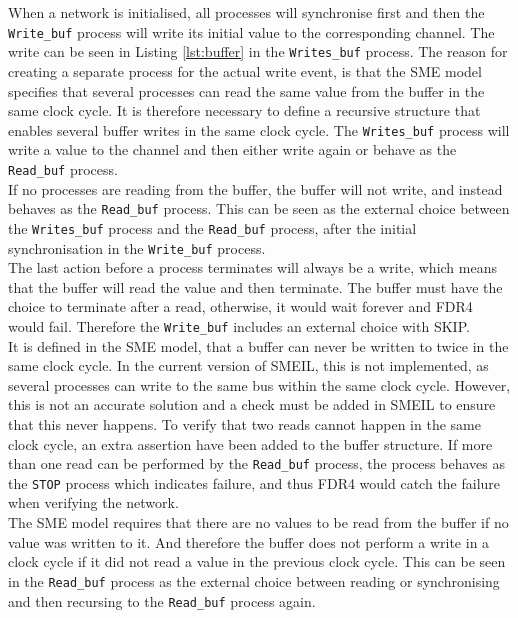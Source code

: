 When a network is initialised, all processes will synchronise first and then the \texttt{Write\_buf} process will write its initial value to the corresponding channel. The write can be seen in Listing \ref{lst:buffer} in the \texttt{Writes\_buf} process. The reason for creating a separate process for the actual write event, is that the SME model specifies that several processes can read the same value from the buffer in the same clock cycle. It is therefore necessary to define a recursive structure that enables several buffer writes in the same clock cycle. The \texttt{Writes\_buf} process will write a value to the channel and then either write again or behave as the \texttt{Read\_buf} process.\\

If no processes are reading from the buffer, the buffer will not write, and instead behaves as the \texttt{Read\_buf} process. This can be seen as the external choice between the \texttt{Writes\_buf} process and the \texttt{Read\_buf} process, after the initial synchronisation in the \texttt{Write\_buf} process.\\

The last action before a process terminates will always be a write, which means that the buffer will read the value and then terminate. The buffer must have the choice to terminate after a read, otherwise, it would wait forever and FDR4 would fail. Therefore the \texttt{Write\_buf} includes an external choice with SKIP. \\

It is defined in the SME model, that a buffer can never be written to twice in the same clock cycle. In the current version of SMEIL, this is not implemented, as several processes can write to the same bus within the same clock cycle. However, this is not an accurate solution and a check must be added in SMEIL to ensure that this never happens. To verify that two reads cannot happen in the same clock cycle, an extra assertion have been added to the buffer structure.
If more than one read can be performed by the \texttt{Read\_buf} process, the process behaves as the \texttt{STOP} process which indicates failure, and thus FDR4 would catch the failure when verifying the network.\\

The SME model requires that there are no values to be read from the buffer if no value was written to it. And therefore the buffer does not perform a write in a clock cycle if it did not read a value in the previous clock cycle. This can be seen in the \texttt{Read\_buf} process as the external choice between reading or synchronising and then recursing to the \texttt{Read\_buf} process again.\\


